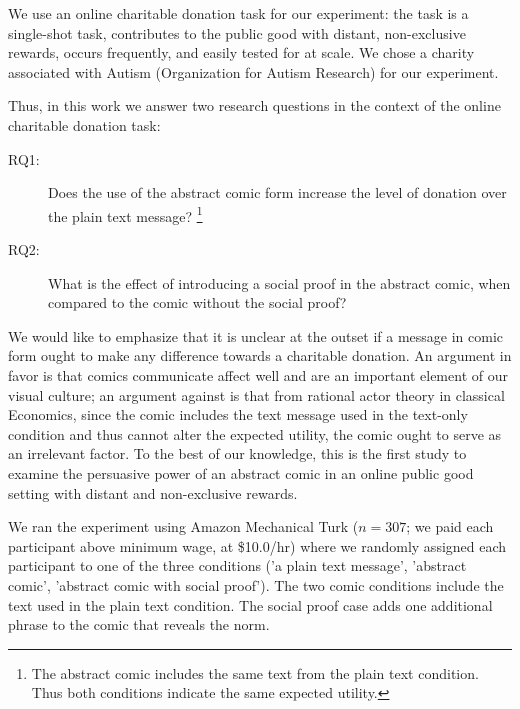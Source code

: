 We use an online charitable donation task for our experiment: the task is a  single-shot task, contributes to the public good with distant, non-exclusive rewards, occurs frequently, and easily tested for at scale. We chose a charity associated with Autism (Organization for Autism Research) for our experiment.

Thus, in this work we answer two research questions in the context of the online charitable donation task:
\begin{description}
    \item[RQ1:] Does the use of the abstract comic form increase the level of donation over the plain text message? \footnote{The abstract comic includes the same text from the plain text condition. Thus both conditions indicate the same expected utility.}
    \item[RQ2:] What is the effect of introducing a social proof in the abstract comic, when compared to the comic without the social proof?
\end{description}

We would like to emphasize that it is unclear at the outset if a message in comic form ought to make any difference towards a charitable donation. An argument in favor is that comics communicate affect well and are an important element of our visual culture; an argument against is that from rational actor theory in classical Economics, since the comic includes the text message used in the text-only condition and thus cannot alter the expected utility, the comic ought to serve as an irrelevant factor. To the best of our knowledge, this is the first study to examine the persuasive power of an abstract comic in an online public good setting with distant and non-exclusive rewards. 

We ran the experiment using Amazon Mechanical Turk ($n=307$; we paid each participant above minimum wage, at \$10.0/hr) where we randomly assigned each participant to one of the three conditions ('a plain text message', 'abstract comic', 'abstract comic with social proof'). The two comic conditions include the text used in the plain text condition. The social proof case adds one additional phrase to the comic that reveals the norm.

